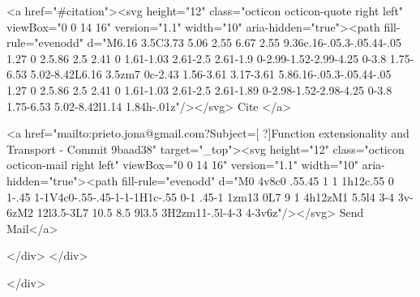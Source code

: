       <a  href="#citation"><svg height="12" class="octicon octicon-quote right left" viewBox="0 0 14 16" version="1.1" width="10" aria-hidden="true"><path fill-rule="evenodd" d="M6.16 3.5C3.73 5.06 2.55 6.67 2.55 9.36c.16-.05.3-.05.44-.05 1.27 0 2.5.86 2.5 2.41 0 1.61-1.03 2.61-2.5 2.61-1.9 0-2.99-1.52-2.99-4.25 0-3.8 1.75-6.53 5.02-8.42L6.16 3.5zm7 0c-2.43 1.56-3.61 3.17-3.61 5.86.16-.05.3-.05.44-.05 1.27 0 2.5.86 2.5 2.41 0 1.61-1.03 2.61-2.5 2.61-1.89 0-2.98-1.52-2.98-4.25 0-3.8 1.75-6.53 5.02-8.42l1.14 1.84h-.01z"/></svg> Cite
      </a>

      <a href="mailto:prieto.jona@gmail.com?Subject=[ ?]Function extensionality and Transport - Commit 9baad38" target="_top"><svg height="12" class="octicon octicon-mail right left" viewBox="0 0 14 16" version="1.1" width="10" aria-hidden="true"><path fill-rule="evenodd" d="M0 4v8c0 .55.45 1 1 1h12c.55 0 1-.45 1-1V4c0-.55-.45-1-1-1H1c-.55 0-1 .45-1 1zm13 0L7 9 1 4h12zM1 5.5l4 3-4 3v-6zM2 12l3.5-3L7 10.5 8.5 9l3.5 3H2zm11-.5l-4-3 4-3v6z"/></svg> Send Mail</a>

    </div>
  </div>

</div>




